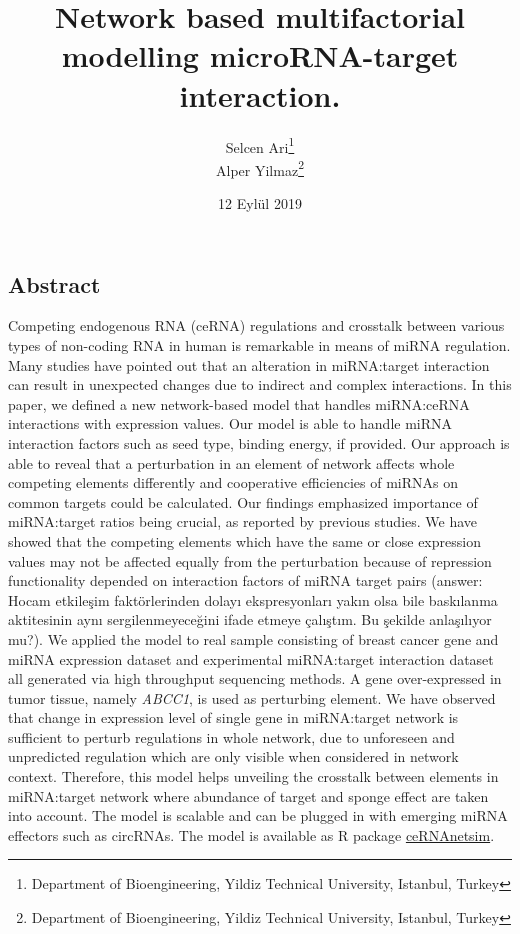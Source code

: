 \documentclass[a4,center,fleqn]{NAR}
\title{Network based multifactorial modelling microRNA-target interaction.}
\author{Selcen Ari\footnote{Department of Bioengineering, Yildiz Technical
  University, Istanbul, Turkey} \\ Alper Yilmaz\footnote{Department of Bioengineering, Yildiz Technical
  University, Istanbul, Turkey}}
\date{12 Eylül 2019}
\begin{document}
\maketitle

\hypertarget{abstract}{%
\subsection{Abstract}\label{abstract}}

Competing endogenous RNA (ceRNA) regulations and crosstalk between
various types of non-coding RNA in human is remarkable in means of miRNA
regulation. Many studies have pointed out that an alteration in
miRNA:target interaction can result in unexpected changes due to
indirect and complex interactions. In this paper, we defined a new
network-based model that handles miRNA:ceRNA interactions with
expression values. Our model is able to handle miRNA interaction factors
such as seed type, binding energy, if provided. Our approach is able to
reveal that a perturbation in an element of network affects whole
competing elements differently and cooperative efficiencies of miRNAs on
common targets could be calculated. Our findings emphasized importance
of miRNA:target ratios being crucial, as reported by previous studies.
We have showed that the competing elements which have the same or close
expression values may not be affected equally from the perturbation
because of repression functionality depended on interaction factors of
miRNA target pairs (answer: Hocam etkileşim faktörlerinden dolayı
ekspresyonları yakın olsa bile baskılanma aktitesinin aynı
sergilenmeyeceğini ifade etmeye çalıştım. Bu şekilde anlaşılıyor mu?).
We applied the model to real sample consisting of breast cancer gene and
miRNA expression dataset and experimental miRNA:target interaction
dataset all generated via high throughput sequencing methods. A gene
over-expressed in tumor tissue, namely \emph{ABCC1}, is used as
perturbing element. We have observed that change in expression level of
single gene in miRNA:target network is sufficient to perturb regulations
in whole network, due to unforeseen and unpredicted regulation which are
only visible when considered in network context. Therefore, this model
helps unveiling the crosstalk between elements in miRNA:target network
where abundance of target and sponge effect are taken into account. The
model is scalable and can be plugged in with emerging miRNA effectors
such as circRNAs. The model is available as R package
\href{https://github.com/selcenari/ceRNAnetsim}{ceRNAnetsim}.
\end{document}

